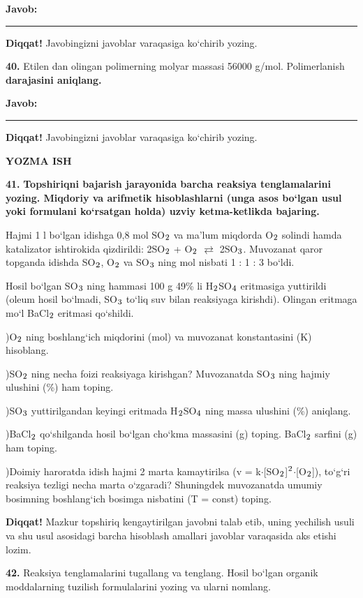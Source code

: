 \documentclass[11pt,a4paper]{article}
\renewcommand{\textsubscript}[1]{\ensuremath{_{\text{\fontsize{8}{8}\selectfont #1}}}}
\renewcommand{\textsuperscript}[1]{\ensuremath{^{\text{\fontsize{8}{8}\selectfont #1}}}}
\newcommand{\diqqat}[1]{\par\smallskip\noindent\textbf{Diqqat!} #1\par\medskip}
\newcommand{\javob}{\par\smallskip\noindent\textbf{Javob:} \rule[-2pt]{7.5cm}{0.4pt}\par\smallskip\noindent\textbf{Diqqat!} Javobingizni javoblar varaqasiga ko`chirib yozing.\par\medskip}
\begin{document}
\javob
\noindent\textbf{40.} Etilen dan olingan polimerning molyar massasi 56000 g/mol. Polimerlanish \textbf{darajasini aniqlang.}
\javob
\par\bigskip\begin{center}\textbf{\fontsize{13}{15}\selectfont YOZMA ISH}\end{center}
\noindent\textbf{41.} \textbf{Topshiriqni bajarish jarayonida barcha reaksiya tenglamalarini yozing. Miqdoriy va arifmetik hisoblashlarni (unga asos bo`lgan usul yoki formulani ko`rsatgan holda) uzviy ketma-ketlikda bajaring.}\par\smallskip
Hajmi 1 l bo`lgan idishga 0,8 mol SO\textsubscript{2} va ma'lum miqdorda O\textsubscript{2} solindi hamda katalizator ishtirokida qizdirildi: 2SO\textsubscript{2} + O\textsubscript{2} $\rightleftarrows$ 2SO\textsubscript{3}. Muvozanat qaror topganda idishda SO\textsubscript{2}, O\textsubscript{2} va SO\textsubscript{3} ning mol nisbati 1 : 1 : 3 bo`ldi.\par
Hosil bo`lgan SO\textsubscript{3} ning hammasi 100 g 49\% li H\textsubscript{2}SO\textsubscript{4} eritmasiga yuttirildi (oleum hosil bo`lmadi, SO\textsubscript{3} to`liq suv bilan reaksiyaga kirishdi). Olingan eritmaga mo`l BaCl\textsubscript{2} eritmasi qo`shildi.\par
{})O\textsubscript{2} ning boshlang`ich miqdorini (mol) va muvozanat konstantasini (K) hisoblang.\par
{})SO\textsubscript{2} ning necha foizi reaksiyaga kirishgan? Muvozanatda SO\textsubscript{3} ning hajmiy ulushini (\%) ham toping.\par
{})SO\textsubscript{3} yuttirilgandan keyingi eritmada H\textsubscript{2}SO\textsubscript{4} ning massa ulushini (\%) aniqlang.\par
{})BaCl\textsubscript{2} qo`shilganda hosil bo`lgan cho`kma massasini (g) toping. BaCl\textsubscript{2} sarfini (g) ham toping.\par
{})Doimiy haroratda idish hajmi 2 marta kamaytirilsa (v = k$\cdot$[SO\textsubscript{2}]\textsuperscript{2}$\cdot$[O\textsubscript{2}]), to`g`ri reaksiya tezligi necha marta o`zgaradi? Shuningdek muvozanatda umumiy bosimning boshlang`ich bosimga nisbatini (T = const) toping.\par
\diqqat{Mazkur topshiriq kengaytirilgan javobni talab etib, uning yechilish usuli va shu usul asosidagi barcha hisoblash amallari javoblar varaqasida aks etishi lozim.}
\noindent\textbf{42.} Reaksiya tenglamalarini tugallang va tenglang. Hosil bo`lgan organik moddalarning tuzilish formulalarini yozing va ularni nomlang.\par
\end{document}
